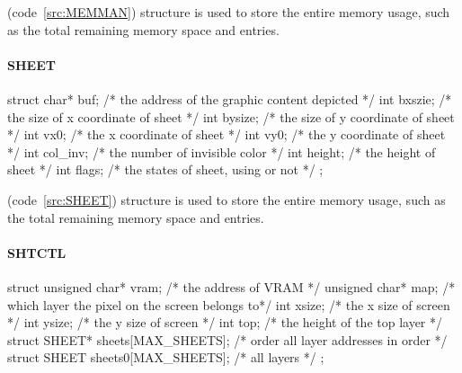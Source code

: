 \documentclass{swfcthesis}
\begin{document}
(code~\ref{src:MEMMAN}) structure is used to store the entire memory usage, such as the total
remaining memory space and entries.



\paragraph{SHEET}

\begin{listing}[H]
  \begin{codeblock}
\begin{ccode}
struct 
{ 
  char* buf;   /* the address of the graphic content depicted */
  int bxszie;  /* the size of x coordinate of sheet */
  int bysize;  /* the size of y coordinate of sheet */
  int vx0;     /* the x coordinate of sheet */
  int vy0;     /* the y coordinate of sheet */
  int col_inv; /* the number of invisible color */
  int height;  /* the height of sheet */
  int flags;   /* the states of sheet, using or not */
};
\end{ccode}
  \end{codeblock}
  \caption{\texttt{struct SHEET}}\label{src:SHEET}
\end{listing}

(code~\ref{src:SHEET}) structure is used to store the entire memory usage, such as the
total remaining memory space and entries.



\paragraph{SHTCTL}

\begin{listing}[H]
  \begin{codeblock}
\begin{ccode}
struct 
{ 
  unsigned char* vram;              /* the address of VRAM */
  unsigned char* map;               /* which layer the pixel on the screen belongs to*/
  int xsize;                        /* the x size of screen */
  int ysize;                        /* the y size of screen */
  int top;                          /* the height of the top layer */
  struct SHEET* sheets[MAX_SHEETS]; /* order all layer addresses in order */
  struct SHEET sheets0[MAX_SHEETS]; /* all layers */
};
\end{ccode}
  \end{codeblock}
  \caption{\texttt{struct SHTCTL}}\label{src:SHTCTL}
\end{listing}
\end{document}
